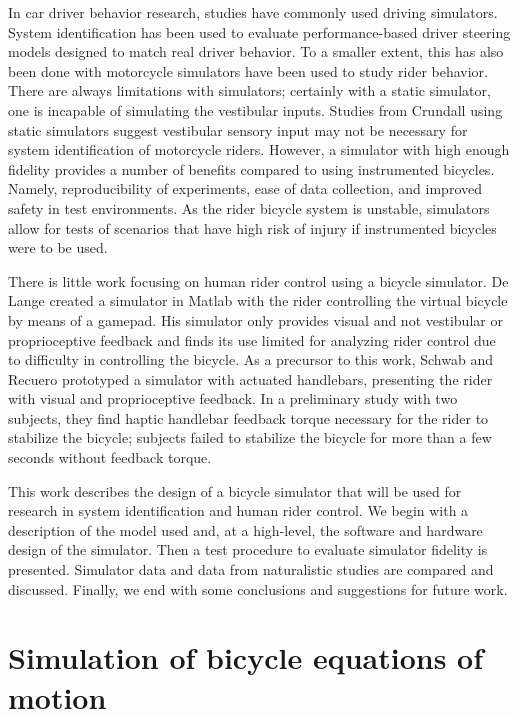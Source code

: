 \documentclass[11pt,a4paper,reqno]{amsart}
\begin{document}
In car driver behavior research, studies have commonly used driving simulators\cite{steen2011}.
System identification has been used to evaluate performance-based driver steering models designed to match real driver
behavior\cite{pilutti1999,steen2011}.
To a smaller extent, this has also been done with motorcycle simulators have been used to study rider
behavior\cite{kovacsova2015}.
There are always limitations with simulators;
certainly with a static simulator, one is incapable of simulating the vestibular inputs.
Studies from Crundall using static simulators suggest vestibular sensory input may not be necessary for system
identification of motorcycle riders\cite{crundall2012}.
However, a simulator with high enough fidelity provides a number of benefits compared to using instrumented bicycles.
Namely, reproducibility of experiments, ease of data collection, and improved safety in test environments.
As the rider bicycle system is unstable, simulators allow for tests of scenarios that have high risk of injury if
instrumented bicycles were to be used.

There is little work focusing on human rider control using a bicycle simulator.
De Lange created a simulator in Matlab with the rider controlling the virtual bicycle by means of a
gamepad\cite{delange2011}.
His simulator only provides visual and not vestibular or proprioceptive feedback and finds its use limited for
analyzing rider control due to difficulty in controlling the bicycle.
As a precursor to this work, Schwab and Recuero prototyped a simulator with actuated handlebars\cite{schwab2013},
presenting the rider with visual and proprioceptive feedback.
In a preliminary study with two subjects, they find haptic handlebar feedback torque necessary for the rider to
stabilize the bicycle;
subjects failed to stabilize the bicycle for more than a few seconds without feedback torque.

This work describes the design of a bicycle simulator that will be used for research in system identification and human
rider control.
We begin with a description of the model used and, at a high-level, the software and hardware design of the simulator.
Then a test procedure to evaluate simulator fidelity is presented.
Simulator data and data from naturalistic studies are compared and discussed.
Finally, we end with some conclusions and suggestions for future work.

\section{Simulation of bicycle equations of motion}
\end{document}
